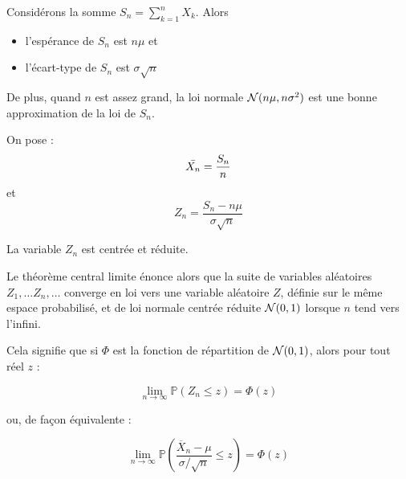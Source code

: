 Considérons la somme $S_n = \sum_{k=1}^n X_k$. Alors 
\begin{itemize}
  \item l'espérance de $S_n$ est $n\mu$ et
  \item l'écart-type de $S_n$ est $\sigma\sqrt{n}$
\end{itemize}

De plus, quand $n$  est \og assez grand\fg{}, la loi normale $\mathcal{N}(n\mu, n\sigma^2)$ est une bonne approximation de la loi de $S_n$.

On pose : 
\[ \Bar{X_n} = \frac{S_n}{n} \]
et 
\[ Z_n = \frac{S_n - n\mu}{\sigma\sqrt{n}} \]

La variable $Z_n$ est centrée et réduite.

Le théorème central limite énonce alors que la suite de variables aléatoires $Z_1, \ldots Z_n, \ldots$ converge en loi vers une variable aléatoire $Z$, définie sur le même espace probabilisé, et de loi normale centrée réduite $\mathcal{N}(0,1)$ lorsque $n$ tend vers l'infini.

Cela signifie que si $\Phi$ est la fonction de répartition de $\mathcal{N}(0,1)$, alors pour tout réel $z$ :

\[ \lim_{n \to \infty} \mathbb P(Z_n \le z) = \Phi(z) \]

ou, de façon équivalente :

\[ \lim_{n \to \infty}\mathbb P\left(\frac{\overline X_n - \mu}{\sigma/\sqrt n}\leq z\right) = \Phi(z)\]


